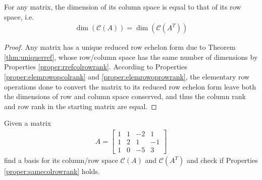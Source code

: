 \begin{proper}
\label{proper:samecolrowrank}
For any matrix, the dimension of its column space is equal to that of its row space, i.e.
\begin{align*}
\dim(\mathcal{C}(A)) = \dim(\mathcal{C}(A^T))
\end{align*}
\end{proper}
\begin{proof}
Any matrix has a unique reduced row echelon form due to Theorem \ref{thm:uniquerref}, whose row/column space has the same number of dimensions by Properties \ref{proper:rrefcolrowrank}. According to Properties \ref{proper:elemrowopcolrank} and \ref{proper:elemrowoprowrank}, the elementary row operations done to convert the matrix to its reduced row echelon form leave both the dimensions of row and column space conserved, and thus the column rank and row rank in the starting matrix are equal.
\end{proof}
\begin{exmp}
\label{exmp:colrowspace}
Given a matrix
\begin{align*}
A = 
\begin{bmatrix}
1 & 1 & -2 & 1 \\
1 & 2 & 1 & -1 \\
1 & 0 & -5 & 3
\end{bmatrix}
\end{align*}
find a basis for its column/row space $\mathcal{C}(A)$ and $\mathcal{C}(A^T)$ and check if Properties \ref{proper:samecolrowrank} holds.
\end{exmp}
